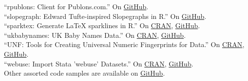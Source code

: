 \documentclass[12pt]{article}
\newcommand{\entry}[1]{\indent {\color{lg}\guillemotright}\hspace{2pt}#1\vspace{.25em}\\}
\begin{document}
	\entry{``rpublons: Client for Publons.com.'' On \href{https://github.com/leeper/publons}{GitHub}.}
	\entry{``slopegraph: Edward Tufte-inspired Slopegraphs in R.'' On \href{https://github.com/leeper/slopegraph}{GitHub}.}
	\entry{``sparktex: Generate LaTeX sparklines in R.'' On \href{https://cran.r-project.org/package=sparktex}{CRAN}, \href{https://github.com/leeper/sparktex}{GitHub}.}
	\entry{``ukbabynames: UK Baby Names Data.'' On \href{https://cran.r-project.org/package=ukbabynames}{CRAN}, \href{https://github.com/leeper/ukbabynames}{GitHub}.}
	\entry{``UNF: Tools for Creating Universal Numeric Fingerprints for Data.'' On \href{https://cran.r-project.org/package=UNF}{CRAN}, \href{https://github.com/leeper/UNF}{GitHub}.}
	\entry{``webuse: Import Stata 'webuse' Datasets.'' On \href{https://cran.r-project.org/package=webuse}{CRAN}, \href{https://github.com/leeper/webuse}{GitHub}.}
	\entry{Other assorted code samples are available on \href{http://github.com/leeper}{GitHub}.}
\end{document}
